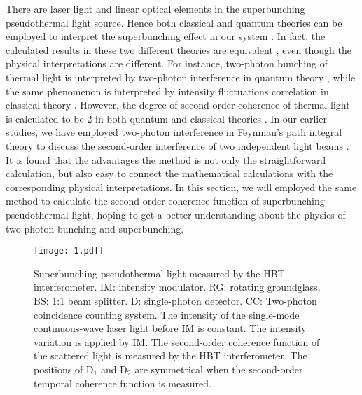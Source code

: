 \documentclass[12pt]{iopart}
\begin{document}
There are laser light and linear optical elements in the superbunching pseudothermal light source. Hence both classical and quantum theories can be employed to interpret the superbunching effect in our system \cite{klyshko}. In fact, the calculated results in these two different theories are equivalent \cite{glauber-2,sudarshan}, even though the physical interpretations are different. For instance, two-photon bunching of thermal light is interpreted by two-photon interference in quantum theory \cite{purcell,fano}, while the same phenomenon is interpreted by intensity fluctuations correlation in classical theory \cite{HBT-2}. However, the degree of second-order coherence of thermal light is calculated to be 2 in both quantum and classical theories \cite{mandel-book}. In our earlier studies, we have employed two-photon interference in Feynman's path integral theory to discuss the second-order interference of two independent light beams \cite{zhou,liu-1,liu-2,liu-3,liu-4,liu-5,liu-6}. It is found that the advantages the method is not only the straightforward calculation, but also easy to connect the mathematical calculations with the corresponding physical interpretations.  In this section, we will employed the same method to calculate the second-order coherence function of superbunching pseudothermal light, hoping to get a better understanding about the physics of two-photon bunching and superbunching.

\begin{figure}[htbp]
\centering
\texttt{[image: 1.pdf]}
\caption{Superbunching pseudothermal light measured by the HBT interferometer. IM: intensity modulator. RG: rotating groundglass. BS: 1:1 beam splitter. D: single-photon detector. CC: Two-photon coincidence counting system. The intensity of the single-mode continuous-wave laser light before IM is constant. The intensity variation is applied by IM. The second-order coherence function of the scattered light is measured by the HBT interferometer. The positions of D$_1$ and D$_2$ are symmetrical when the second-order temporal coherence function is measured.}\label{calculation}
\end{figure}
\end{document}
